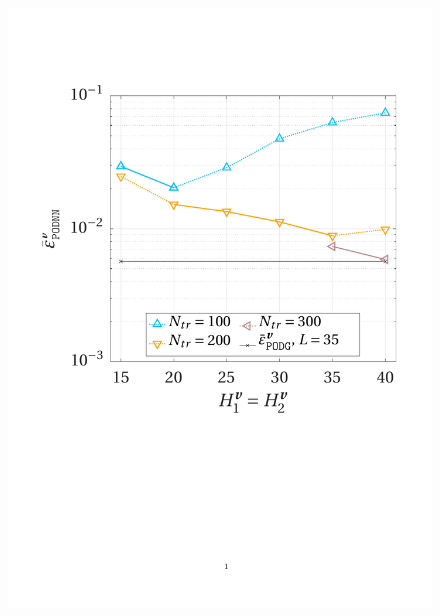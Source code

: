 \documentclass[longtitle]{elsarticle}
\numberwithin{equation}{section}
\theoremstyle{theorem}
\theoremstyle{definition}
\theoremstyle{remark}
\theoremstyle{proposition}
\numberwithin{figure}{section}
\begin{document}
\begin{figure}[h!]
			\includegraphics[scale = 0.37, trim = {1cm 9cm 1.5cm 3.5cm}, clip]{dc_400_vel_nn_convergence} \\

\end{figure}
\end{document}
